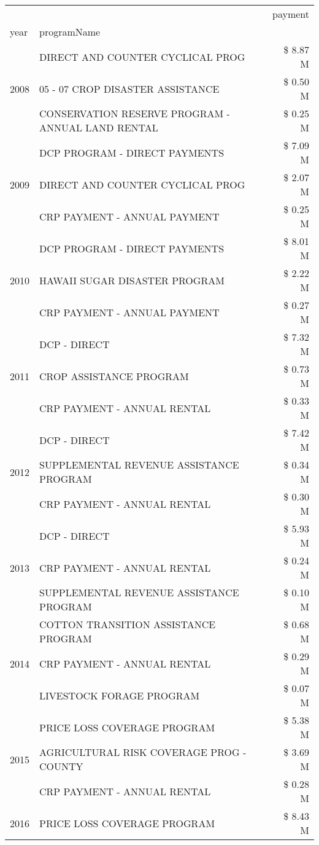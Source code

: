 \begin{tabular}{llr}
\toprule
 &  & payment \\
year & programName &  \\
\midrule
\multirow[t]{3}{*}{2008} & DIRECT AND COUNTER CYCLICAL PROG & \$ 8.87 M \\
 & 05 - 07 CROP DISASTER ASSISTANCE & \$ 0.50 M \\
 & CONSERVATION RESERVE PROGRAM - ANNUAL LAND RENTAL & \$ 0.25 M \\
\cline{1-3}
\multirow[t]{3}{*}{2009} & DCP PROGRAM - DIRECT PAYMENTS & \$ 7.09 M \\
 & DIRECT AND COUNTER CYCLICAL PROG & \$ 2.07 M \\
 & CRP PAYMENT - ANNUAL PAYMENT & \$ 0.25 M \\
\cline{1-3}
\multirow[t]{3}{*}{2010} & DCP PROGRAM - DIRECT PAYMENTS & \$ 8.01 M \\
 & HAWAII SUGAR DISASTER PROGRAM & \$ 2.22 M \\
 & CRP PAYMENT - ANNUAL PAYMENT & \$ 0.27 M \\
\cline{1-3}
\multirow[t]{3}{*}{2011} & DCP - DIRECT & \$ 7.32 M \\
 & CROP ASSISTANCE PROGRAM & \$ 0.73 M \\
 & CRP PAYMENT - ANNUAL RENTAL & \$ 0.33 M \\
\cline{1-3}
\multirow[t]{3}{*}{2012} & DCP - DIRECT & \$ 7.42 M \\
 & SUPPLEMENTAL REVENUE ASSISTANCE PROGRAM & \$ 0.34 M \\
 & CRP PAYMENT - ANNUAL RENTAL & \$ 0.30 M \\
\cline{1-3}
\multirow[t]{3}{*}{2013} & DCP - DIRECT & \$ 5.93 M \\
 & CRP PAYMENT - ANNUAL RENTAL & \$ 0.24 M \\
 & SUPPLEMENTAL REVENUE ASSISTANCE PROGRAM & \$ 0.10 M \\
\cline{1-3}
\multirow[t]{3}{*}{2014} & COTTON TRANSITION ASSISTANCE PROGRAM & \$ 0.68 M \\
 & CRP PAYMENT - ANNUAL RENTAL & \$ 0.29 M \\
 & LIVESTOCK FORAGE PROGRAM & \$ 0.07 M \\
\cline{1-3}
\multirow[t]{3}{*}{2015} & PRICE LOSS COVERAGE PROGRAM & \$ 5.38 M \\
 & AGRICULTURAL RISK COVERAGE PROG - COUNTY & \$ 3.69 M \\
 & CRP PAYMENT - ANNUAL RENTAL & \$ 0.28 M \\
\cline{1-3}
\multirow[t]{3}{*}{2016} & PRICE LOSS COVERAGE PROGRAM                   & \$ 8.43 M \\

\end{tabular}
